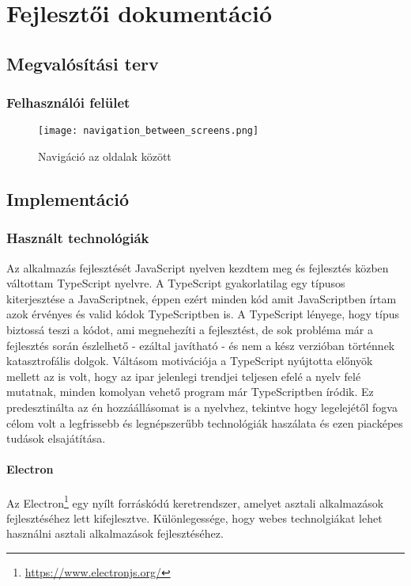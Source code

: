 \chapter{Fejlesztői dokumentáció} %
\label{ch:impl}




\section{Megvalósítási terv}

\subsection{Felhasználói felület}
\begin{figure}[H]
	\centering
	\texttt{[image: navigation\_between\_screens.png]}
	\caption{Navigáció az oldalak között}
	\label{fig:search}
\end{figure}

\section{Implementáció}

\subsection{Használt technológiák}
Az alkalmazás fejlesztését JavaScript nyelven kezdtem meg és fejlesztés közben váltottam TypeScript nyelvre. A TypeScript gyakorlatilag egy típusos kiterjesztése a JavaScriptnek, éppen ezért minden kód amit JavaScriptben írtam azok érvényes és valid kódok TypeScriptben is. A TypeScript lényege, hogy típus biztossá teszi a kódot, ami megnehezíti a fejlesztést, de sok probléma már a fejlesztés során észlelhető - ezáltal javítható - és nem a kész verzióban történnek katasztrofális dolgok. Váltásom motivációja a TypeScript nyújtotta előnyök mellett az is volt, hogy az ipar jelenlegi trendjei teljesen efelé a nyelv felé mutatnak, minden komolyan vehető program már TypeScriptben íródik. Ez predesztinálta az én hozzáállásomat is a nyelvhez, tekintve hogy legelejétől fogva célom volt a legfrissebb és legnépszerűbb technológiák haszálata és ezen piacképes tudások elsajátítása.

\subsubsection{Electron}
Az Electron\footnote{\url{https://www.electronjs.org/}} egy nyílt forráskódú keretrendszer, amelyet asztali alkalmazások fejlesztéséhez lett kifejlesztve. Különlegessége, hogy webes technolgiákat lehet használni asztali alkalmazások fejlesztéséhez.

